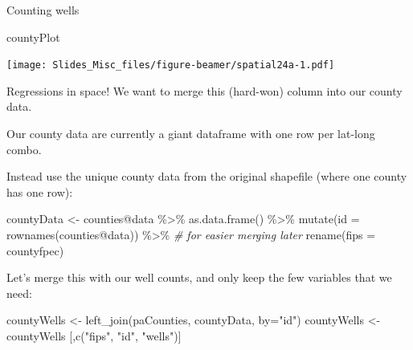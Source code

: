 \documentclass[
  ignorenonframetext,
]{beamer}
\newenvironment{Shaded}{\begin{snugshade}}{\end{snugshade}}
\newcommand{\AttributeTok}[1]{\textcolor[rgb]{0.77,0.63,0.00}{#1}}
\newcommand{\CommentTok}[1]{\textcolor[rgb]{0.56,0.35,0.01}{\textit{#1}}}
\newcommand{\FunctionTok}[1]{\textcolor[rgb]{0.00,0.00,0.00}{#1}}
\newcommand{\NormalTok}[1]{#1}
\newcommand{\OtherTok}[1]{\textcolor[rgb]{0.56,0.35,0.01}{#1}}
\newcommand{\SpecialCharTok}[1]{\textcolor[rgb]{0.00,0.00,0.00}{#1}}
\newcommand{\StringTok}[1]{\textcolor[rgb]{0.31,0.60,0.02}{#1}}
\begin{document}
\begin{frame}[fragile]{Counting wells}
\protect\hypertarget{counting-wells-2}{}
\begin{Shaded}
\begin{Highlighting}[]
\NormalTok{countyPlot}
\end{Highlighting}
\end{Shaded}

\texttt{[image: Slides\_Misc\_files/figure-beamer/spatial24a-1.pdf]}
\end{frame}

\begin{frame}[fragile]{Regressions in space!}
\protect\hypertarget{regressions-in-space}{}
We want to merge this (hard-won) column into our county data.

Our county data are currently a giant dataframe with one row per
lat-long combo.

Instead use the unique county data from the original shapefile (where
one county has one row): \tiny

\begin{Shaded}
\begin{Highlighting}[]
\NormalTok{countyData }\OtherTok{\textless{}{-}}\NormalTok{ counties}\SpecialCharTok{@}\NormalTok{data }\SpecialCharTok{\%\textgreater{}\%}
      \FunctionTok{as.data.frame}\NormalTok{() }\SpecialCharTok{\%\textgreater{}\%}
      \FunctionTok{mutate}\NormalTok{(}\AttributeTok{id =} \FunctionTok{rownames}\NormalTok{(counties}\SpecialCharTok{@}\NormalTok{data)) }\SpecialCharTok{\%\textgreater{}\%}
    \CommentTok{\# for easier merging later}
      \FunctionTok{rename}\NormalTok{(}\AttributeTok{fips =}\NormalTok{ countyfpec)}
\end{Highlighting}
\end{Shaded}

\normalsize

Let's merge this with our well counts, and only keep the few variables
that we need:

\tiny

\begin{Shaded}
\begin{Highlighting}[]
\NormalTok{countyWells }\OtherTok{\textless{}{-}} \FunctionTok{left\_join}\NormalTok{(paCounties, countyData, }\AttributeTok{by=}\StringTok{"id"}\NormalTok{)}
\NormalTok{countyWells }\OtherTok{\textless{}{-}}\NormalTok{countyWells [,}\FunctionTok{c}\NormalTok{(}\StringTok{"fips"}\NormalTok{, }\StringTok{"id"}\NormalTok{, }\StringTok{"wells"}\NormalTok{)]}
\end{Highlighting}
\end{Shaded}
\end{frame}
\end{document}
